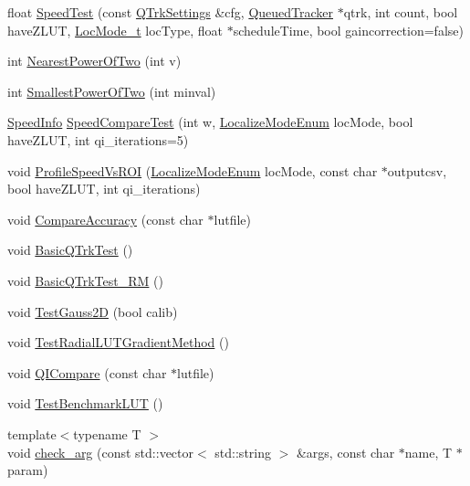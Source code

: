 \begin{DoxyCompactItemize}
\item 
float \hyperlink{test_8cu_a7522ae4758ce1a51e910c5c7bc0754fc}{Speed\+Test} (const \hyperlink{struct_q_trk_settings}{Q\+Trk\+Settings} \&cfg, \hyperlink{class_queued_tracker}{Queued\+Tracker} $\ast$qtrk, int count, bool have\+Z\+L\+UT, \hyperlink{qtrk__c__api_8h_a6ba72ec1daa19642f85a47defe8f0812}{Loc\+Mode\+\_\+t} loc\+Type, float $\ast$schedule\+Time, bool gaincorrection=false)
\item 
int \hyperlink{test_8cu_a734d595c55ad19e5588166314c407985}{Nearest\+Power\+Of\+Two} (int v)
\item 
int \hyperlink{test_8cu_a217db03f0523b4bb2d71cfacb0121b7c}{Smallest\+Power\+Of\+Two} (int minval)
\item 
\hyperlink{struct_speed_info}{Speed\+Info} \hyperlink{test_8cu_a386abc59c14c98a64bdb672b4e671a3f}{Speed\+Compare\+Test} (int w, \hyperlink{qtrk__c__api_8h_a9d32512eae44894026802d1a688c7e3b}{Localize\+Mode\+Enum} loc\+Mode, bool have\+Z\+L\+UT, int qi\+\_\+iterations=5)
\item 
void \hyperlink{test_8cu_a398bf23d2be3e7a123ba643f6f3a0b3c}{Profile\+Speed\+Vs\+R\+OI} (\hyperlink{qtrk__c__api_8h_a9d32512eae44894026802d1a688c7e3b}{Localize\+Mode\+Enum} loc\+Mode, const char $\ast$outputcsv, bool have\+Z\+L\+UT, int qi\+\_\+iterations)
\item 
void \hyperlink{test_8cu_a52f6a285cdac289bef2e449cb1278da1}{Compare\+Accuracy} (const char $\ast$lutfile)
\item 
void \hyperlink{test_8cu_a2b63751ab1973447f1bffc03497065d3}{Basic\+Q\+Trk\+Test} ()
\item 
void \hyperlink{test_8cu_a6c8a00f627901e0dcf63c20941b47703}{Basic\+Q\+Trk\+Test\+\_\+\+RM} ()
\item 
void \hyperlink{test_8cu_a65c40fb3fc43deca2fe22e72b77c5bfc}{Test\+Gauss2D} (bool calib)
\item 
void \hyperlink{test_8cu_afb0912d78b2802b324d5a8500fc84d87}{Test\+Radial\+L\+U\+T\+Gradient\+Method} ()
\item 
void \hyperlink{test_8cu_a4e36322bb381a1b9b9eae0e1e6b4a763}{Q\+I\+Compare} (const char $\ast$lutfile)
\item 
void \hyperlink{test_8cu_a8583e2509b7fd83174900ef3e1158c7d}{Test\+Benchmark\+L\+UT} ()
\item 
{\footnotesize template$<$typename T $>$ }\\void \hyperlink{test_8cu_adb9b960bf793e814eeeb65f6a67e0ab9}{check\+\_\+arg} (const std\+::vector$<$ std\+::string $>$ \&args, const char $\ast$name, T $\ast$param)

\end{DoxyCompactItemize}
